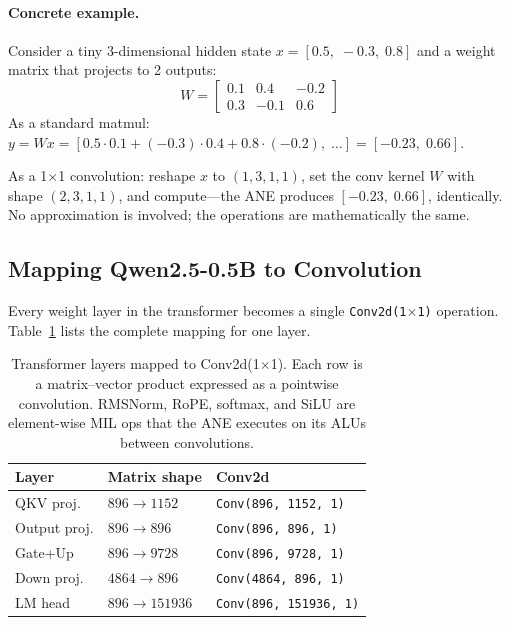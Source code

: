 \documentclass[11pt,twocolumn]{article}
\begin{document}
\paragraph{Concrete example.}
Consider a tiny 3-dimensional hidden state $x = [0.5,\; -0.3,\; 0.8]$
and a weight matrix that projects to 2 outputs:
\[
W = \begin{bmatrix} 0.1 & 0.4 & -0.2 \\ 0.3 & -0.1 & 0.6 \end{bmatrix}
\]
As a standard matmul: $y = Wx = [0.5 \cdot 0.1 + (-0.3) \cdot 0.4 + 0.8 \cdot (-0.2),\;\ldots] = [-0.23,\; 0.66]$.

As a 1$\times$1 convolution: reshape $x$ to $(1, 3, 1, 1)$, set the
conv kernel $W$ with shape $(2, 3, 1, 1)$, and compute---the ANE
produces $[{-}0.23,\; 0.66]$, identically.  No approximation is
involved; the operations are mathematically the same.

\subsection{Mapping Qwen2.5-0.5B to Convolution}

Every weight layer in the transformer becomes a single
\texttt{Conv2d(1$\times$1)} operation.  Table~\ref{tab:conv_mapping}
lists the complete mapping for one layer.

\begin{table}[t]
\centering
\footnotesize
\begin{tabular}{lll}
\toprule
\textbf{Layer} & \textbf{Matrix shape} & \textbf{Conv2d} \\
\midrule
QKV proj. & $896 \to 1152$ & \texttt{Conv(896, 1152, 1)} \\
Output proj. & $896 \to 896$ & \texttt{Conv(896, 896, 1)} \\
Gate+Up & $896 \to 9728$ & \texttt{Conv(896, 9728, 1)} \\
Down proj. & $4864 \to 896$ & \texttt{Conv(4864, 896, 1)} \\
LM head & $896 \to 151936$ & \texttt{Conv(896, 151936, 1)} \\
\bottomrule
\end{tabular}
\caption{Transformer layers mapped to Conv2d(1$\times$1).  Each row
is a matrix--vector product expressed as a pointwise convolution.
RMSNorm, RoPE, softmax, and SiLU are element-wise MIL ops that the
ANE executes on its ALUs between convolutions.}
\label{tab:conv_mapping}
\end{table}
\end{document}
